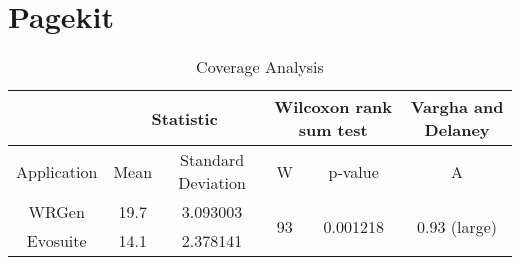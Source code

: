 \section{Pagekit}
\begin{table}[H]
	\centering
	\caption{Coverage Analysis}
	\begin{adjustbox}{max width=\textwidth}
		\begin{tabular}{|c|c|c|c|c|c|}
		\hline
			& \multicolumn{2}{c|}{Statistic} & \multicolumn{2}{c|}{Wilcoxon rank sum test} & Vargha and Delaney    \\
		\hline
			Application & Mean   & Standard Deviation   & W                               & p-value                             & A            			         \\
		\hline
			WRGen       & 19.7     & 3.093003             & \multirow{2}{*}{93}             & \multirow{2}{*}{0.001218}            & \multirow{2}{*}{0.93 (large)}  \\
		\cline{1-3}
			Evosuite    & 14.1   & 2.378141             &                                 &                                     &            			   		 \\
		\hline
		\end{tabular}
	\end{adjustbox}
\end{table}

